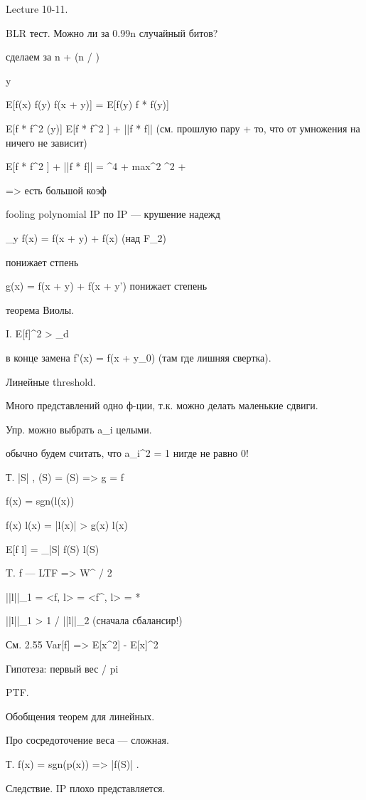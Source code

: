Lecture 10-11.


BLR тест. Можно ли за 0.99n случайный битов?

сделаем за n + \log(n / \eps)

y ~ \phi

\teta \le E[f(x) f(y) f(x + y)] = E[f(y) f * f(y)] \le {} 

E[f * f^2 (y)] \le E[f * f^2 ] + ||f * f|| \eps  (см. прошлую пару + то, что от умножения на \chi ничего не зависит)

E[f * f^2 ] + ||f * f|| \eps = \sum {}^4 + \eps \le  max{^2} \sum {}^2 + \eps

=> есть большой коэф


fooling polynomial
IP по IP --- крушение надежд

\Delta_y f(x) = f(x + y) + f(x) (над F_2)

\Delta понижает стпень

g(x) = f(x + y) + f(x + y') понижает степень


теорема Виолы.

I. E[f]^2 > \eps_d

в конце замена f'(x) = f(x + y_0) (там где лишняя свертка).





Линейные threshold.

Много представлений одно ф-ции, т.к. можно делать маленькие сдвиги.

Упр. можно выбрать a_i целыми.

обычно будем считать, что \sum a_i^2 = 1
нигде не равно 0!


Т. |S| , (S) = (S) => g = f

f(x) = sgn(l(x))

f(x) l(x) = |l(x)| > g(x) l(x)

E[f l] = \sum_{|S| } f(S) l(S)


T. f --- LTF => W^{}  / 2

||l||_1 = <f, l> = <f^{}, l> = \sqrt{!} * 

||l||_1 > 1 /  ||l||_2 (сначала сбалансир!)

См. 2.55 Var[f] => E[x^2] - E[x]^2



Гипотеза: первый вес  / pi



PTF.

Обобщения теорем для линейных.

Про сосредоточение веса --- сложная.


Т. f(x) = sgn(p(x)) => \sum |f(S)| .

Следствие. IP плохо представляется.